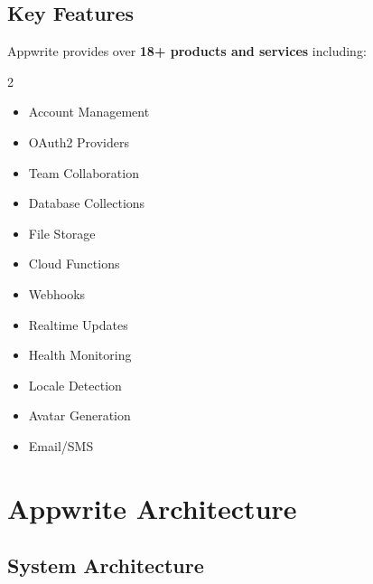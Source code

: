 \documentclass[11pt,a4paper,oneside]{book}
\begin{document}
\section{Key Features}

\begin{keypoint}
Appwrite provides over \textbf{18+ products and services} including:
\begin{multicols}{2}
\begin{itemize}
    \item Account Management
    \item OAuth2 Providers
    \item Team Collaboration
    \item Database Collections
    \item File Storage
    \item Cloud Functions
    \item Webhooks
    \item Realtime Updates
    \item Health Monitoring
    \item Locale Detection
    \item Avatar Generation
    \item Email/SMS
\end{itemize}
\end{multicols}
\end{keypoint}

\chapter{Appwrite Architecture}

\section{System Architecture}
\end{document}
